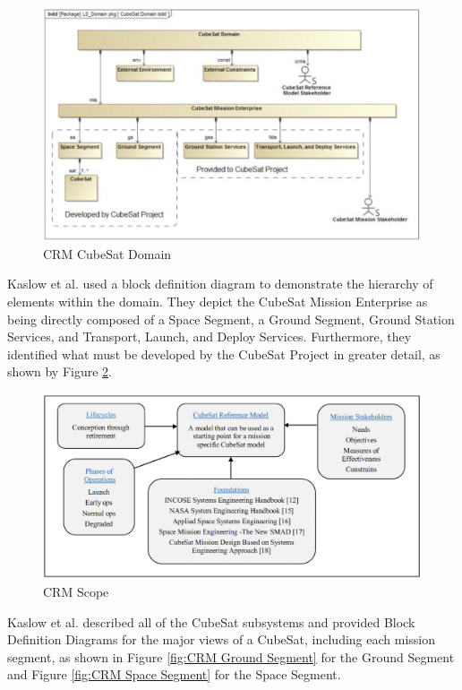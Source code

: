 \begin{figure}[H]
    \centering
    \includegraphics[width=\textwidth]{Thesis/Literature_Review/Lit Review Figures/CubeSat Domain.png}
    \caption{CRM CubeSat Domain}
    \label{fig:CRM Domain}
\end{figure}

Kaslow et al. used a block definition diagram to demonstrate the hierarchy of elements within the domain. They depict the CubeSat Mission Enterprise as being directly composed of a Space Segment, a Ground Segment, Ground Station Services, and Transport, Launch, and Deploy Services. Furthermore, they identified what must be developed by the CubeSat Project in greater detail, as shown by Figure \ref{fig:CRM RA Scope}.


\begin{figure}[H]
    \centering
    \includegraphics[width=\textwidth]{Thesis/Literature_Review/Lit Review Figures/CubeSat RA scope.png}
    \caption{CRM Scope}
    \label{fig:CRM RA Scope}
\end{figure}

Kaslow et al. described all of the CubeSat subsystems and provided Block Definition Diagrams for the major views of a CubeSat, including each mission segment, as shown in Figure \ref{fig:CRM Ground Segment} for the Ground Segment and Figure \ref{fig:CRM Space Segment} for the Space Segment.

